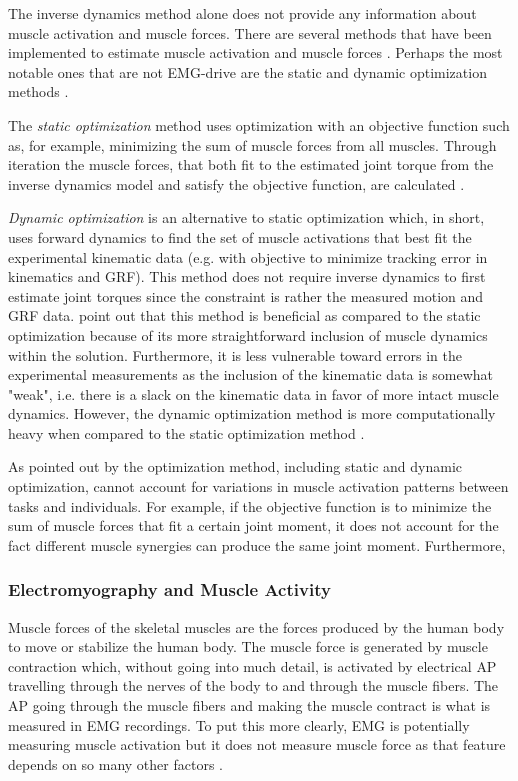 The inverse dynamics method alone does not provide any information about muscle activation and muscle forces.
There are several methods that have been implemented to estimate muscle activation and muscle forces \cite{Erdemir2007}.
Perhaps the most notable ones that are not \ac{EMG}-drive are the static and dynamic optimization methods \cite{Erdemir2007, Delp2007, Pizzolato2015}. 

The \textit{static optimization} method uses optimization with an objective function such as, for example, minimizing the sum of muscle forces from all muscles. 
Through iteration the muscle forces, that both fit to the estimated joint torque from the inverse dynamics model and satisfy the objective function, are calculated \cite{Erdemir2007}. 

\textit{Dynamic optimization} is an alternative to static optimization which, in short, uses forward dynamics to find the set of muscle activations that best fit the experimental kinematic data (e.g. with objective to minimize tracking error in kinematics and \ac{GRF}). 
This method does not require inverse dynamics to first estimate joint torques since the constraint is rather the measured motion and \ac{GRF} data.
 point out that this method is beneficial as compared to the static optimization because of its more straightforward inclusion of muscle dynamics within the solution.
Furthermore, it is less vulnerable toward errors in the experimental measurements as the inclusion of the kinematic data is somewhat "weak", i.e. there is a slack on the kinematic data in favor of more intact muscle dynamics.
However, the dynamic optimization method is more computationally heavy when compared to the static optimization method \cite{Erdemir2007}.

As pointed out by  the optimization method, including static and dynamic optimization, cannot account for variations in muscle activation patterns between tasks and individuals.
For example, if the objective function is to minimize the sum of muscle forces that fit a certain joint moment, it does not account for the fact different muscle synergies can produce the same joint moment. 
Furthermore, 
\cite{Ivanenko2016}

\subsubsection{Electromyography and Muscle Activity}
\label{sec:A-EMG}
Muscle forces of the skeletal muscles are the forces produced by the human body to move or stabilize the human body. 
The muscle force is generated by muscle contraction which, without going into much detail, is activated by electrical \ac{AP} travelling through the nerves of the body to and through the muscle fibers. 
The \ac{AP} going through the muscle fibers and making the muscle contract is what is measured in \ac{EMG} recordings.
To put this more clearly, \ac{EMG} is potentially measuring muscle activation but it does not measure muscle force as that feature depends on so many other factors \cite{Enoka2016}.

